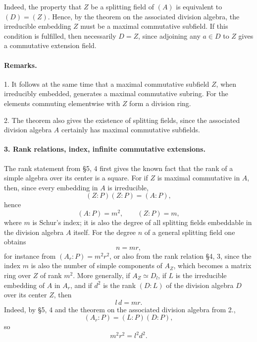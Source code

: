 \documentclass[11pt]{article}
\begin{document}
Indeed, the property that \(Z\) be a splitting field of \((A)\) is equivalent to \((D)=(Z)\). Hence, by the theorem on the associated division algebra, the irreducible embedding \(Z\) must be a maximal commutative subfield. If this condition is fulfilled, then necessarily \(D=Z\), since adjoining any \(a\in D\) to \(Z\) gives a commutative extension field.

\paragraph{Remarks.}
1. It follows at the same time that a maximal commutative subfield \(Z\), when irreducibly embedded, generates a maximal commutative subring. For the elements commuting elementwise with \(Z\) form a division ring.

2. The theorem also gives the existence of splitting fields, since the associated division algebra \(A\) certainly has maximal commutative subfields.

\paragraph{3. Rank relations, index, infinite commutative extensions.}
The rank statement from §5, 4 first gives the known fact that the rank of a simple algebra over its center is a square. For if \(Z\) is maximal commutative in \(A\), then, since every embedding in \(A\) is irreducible,
\[
        (Z:P)(Z:P)=(A:P),
\]
hence
\[
        (A:P)=m^2,\qquad (Z:P)=m,
\]
where \(m\) is Schur's index; it is also the degree of all splitting fields embeddable in the division algebra \(A\) itself. For the degree \(n\) of a general splitting field one obtains
\[
        n=mr,
\]
for instance from \((A_r:P)=m^2r^2\), or also from the rank relation §4, 3, since the index \(m\) is also the number of simple components of \(A_Z\), which becomes a matrix ring over \(Z\) of rank \(m^2\). More generally, if \(A_Z\simeq D_l\), if \(L\) is the irreducible embedding of \(A\) in \(A_r\), and if \(d^2\) is the rank \((D:L)\) of the division algebra \(D\) over its center \(Z\), then
\[
        l\,d=mr .
\]
Indeed, by §5, 4 and the theorem on the associated division algebra from 2.,
\[
        (A_r:P)=(L:P)(D:P),
\]
so
\[
        m^2r^2=l^2d^2 .
\]
\end{document}
